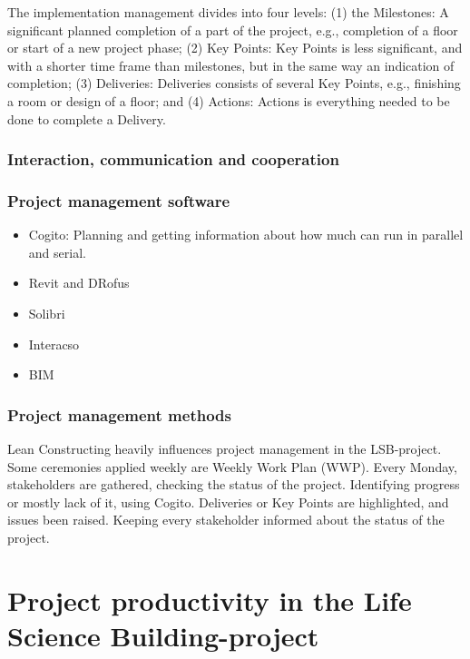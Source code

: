 The implementation management divides into four levels: (1) the Milestones: A significant planned completion of a part of the project, e.g., completion of a floor or start of a new project phase; (2) Key Points: Key Points is less significant, and with a shorter time frame than milestones, but in the same way an indication of completion; (3) Deliveries: Deliveries consists of several Key Points, e.g., finishing a room or design of a floor; and (4) Actions: Actions is everything needed to be done to complete a Delivery. 

\subsubsection{Interaction, communication and cooperation}

\subsubsection{Project management software}

\begin{itemize}
    \item Cogito: Planning and getting information about how much can run in parallel and serial. 
    \item Revit and DRofus
    \item Solibri
    \item Interacso
    \item BIM
\end{itemize}
 
\subsubsection{Project management methods} 
Lean Constructing heavily influences project management in the LSB-project. Some ceremonies applied weekly are Weekly Work Plan (WWP). Every Monday, stakeholders are gathered, checking the status of the project. Identifying progress or mostly lack of it, using Cogito. Deliveries or Key Points are highlighted, and issues been raised. Keeping every stakeholder informed about the status of the project. 

\section{Project productivity in the Life Science Building-project}



\cleardoublepage